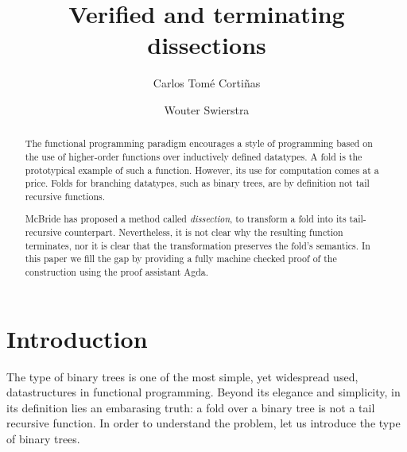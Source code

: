 \documentclass[sigplan,10pt,review]{acmart}
\begin{document}
\title{Verified and terminating dissections}

\author{Carlos Tom\'e Corti\~nas}

\author{Wouter Swierstra}


\begin{abstract}
The functional programming paradigm encourages a style of programming based on
  the use of higher-order functions over inductively defined datatypes. A fold is
  the prototypical example of such a function. However, its use for computation
  comes at a price.  Folds for branching datatypes, such as binary trees, are by
  definition not tail recursive functions.

  McBride has proposed a method called
  \emph{dissection}\cite{McBride:2008:CLM:1328438.1328474}, to
  transform a fold into its tail-recursive counterpart. Nevertheless,
  it is not clear why the resulting function terminates, nor it is
  clear that the transformation preserves the fold's semantics. In
  this paper we fill the gap by providing a fully machine checked
  proof of the construction using the proof assistant Agda.
\end{abstract}






\maketitle




\section{Introduction}

The type of binary trees is one of the most simple, yet widespread used,
datastructures in functional programming.  Beyond its elegance and simplicity,
in its definition lies an embarasing truth: a fold over a binary tree is not a
tail recursive function. In order to understand the problem, let us introduce
the type of binary trees.
\end{document}
